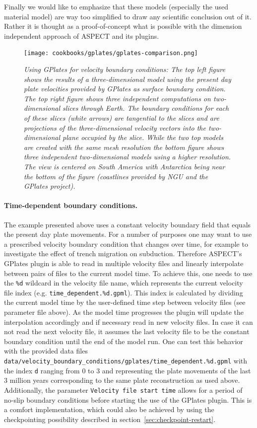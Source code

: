 \documentclass{article}
\newcommand{\aspect}{\textsc{ASPECT}}
\begin{document}
Finally we would like to emphasize that these models (especially the used material model)
are way too simplified to draw any scientific conclusion out of it. Rather it is thought
as a proof-of-concept what is possible with the dimension independent approach of
\aspect{} and its plugins.

\begin{figure}
  \texttt{[image: cookbooks/gplates/gplates-comparison.png]}
  \hfill
  \caption{\it Using GPlates for velocity boundary conditions: The top left figure shows
  the results of a three-dimensional model using the present day plate velocities
  provided by GPlates as surface boundary condition. 
  The top right figure shows three independent computations 
  on two-dimensional slices through Earth. The boundary conditions for each of these slices (white
  arrows) are tangential to the slices and are projections of the
  three-dimensional velocity vectors into the two-dimensional plane
  occupied by the slice. While the two top models are created with the same mesh resolution
  the bottom figure shows three independent two-dimensional models using a higher resolution. 
  The view is centered on South America with Antarctica being near the bottom of
  the figure (coastlines provided by NGU and the GPlates project).}
  \label{fig:gv-1}
\end{figure}

\paragraph{Time-dependent boundary conditions.}
\label{sec:time-dependent-gplates-velocities}
The example presented above uses a constant velocity boundary field that
equals the present day plate movements. For a number of purposes one may want to
use a prescribed velocity boundary condition that changes over time, for example
to investigate the effect of trench migration on subduction. Therefore \aspect{}'s
GPlates plugin is able to read in multiple velocity files and linearly interpolate
between pairs of files to the current model time. To achieve this, one needs
to use the \texttt{\%d} wildcard in the velocity file name, which represents the current
velocity file index (e.g. \texttt{time\_dependent.\%d.gpml}). This index is
calculated by dividing the current model time by the user-defined time step
between velocity files (see parameter file above). As the model time progresses
the plugin will update the interpolation accordingly and if necessary read in
new velocity files. In case it can not read the next velocity file, it assumes
the last velocity file to be the constant boundary condition until the end of
the model run. One can test this behavior with the provided data files
\texttt{data/velocity\_boundary\_conditions/gplates/time\_dependent.\%d.gpml}
with the index \texttt{d} ranging from 0 to 3 and representing the plate movements of
the last 3 million years corresponding to the same plate reconstruction as used
above. Additionally, the parameter \texttt{Velocity file start time} allows for
a period of no-slip boundary conditions before starting the use of the GPlates plugin.
This is a comfort implementation, which could also be achieved by using the checkpointing
possibility described in section~\ref{sec:checkpoint-restart}. 
\end{document}
